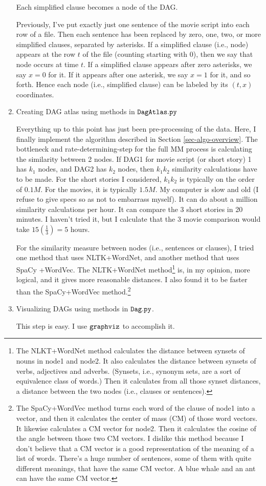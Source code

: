 \documentclass[12pt]{article}
\begin{document}
\begin{enumerate}
Each simplified clause becomes a node of the DAG.

Previously, I've put exactly just one sentence 
of the movie script into each row of a file.
Then each sentence has been 
replaced by zero, one, two, or more simplified clauses, separated by asterisks.
If  a simplified clause (i.e., node) appears at the
row $t$ of the file (counting starting with 0), then 
we say that node occurs at time $t$. If a simplified clause appears after zero asterisks, we say $x=0$ for it.
If it appears after one asterisk, we say $x=1$ for it, and so forth. Hence each node (i.e., simplified clause)
can be labeled by its $(t,x)$ coordinates.


\item Creating DAG atlas using methods in
$\tt DagAtlas.py$

Everything up to this point has just been
pre-processing of the data. 
Here, I finally implement the algorithm described
in Section \ref{sec-algo-overview}.
The bottleneck and rate-determining-step for
the full MM process is
calculating the similarity between 2 nodes.
If DAG1 for movie script (or short story) 1 has $k_1$ 
nodes, and DAG2 has $k_2$ nodes,
then $k_1 k_2$ similarity calculations have to be made.
For the short stories I considered, $k_1k_2$
is typically on the order of $0.1M$.
For the movies, it is typically $1.5M$.
My computer is slow and old (I refuse
to give specs so as not to embarrass myself).
It can do about a million similarity calculations per hour. It can compare the 3 short stories in 20 minutes. I haven't tried it, but I calculate that the
3 movie comparison would take $15(\frac{1}{3})=5$ hours.

For the similarity measure between nodes (i.e., sentences or clauses), I tried one method that uses NLTK+WordNet,
and another method that uses SpaCy  +WordVec.
The NLTK+WordNet method\footnote{The NLKT+WordNet method 
calculates the distance between synsets  of nouns
in node1 and node2.  It also calculates the distance between synsets of verbs, adjectives and adverbs. (Synsets, i.e., synonym sets,
are a sort of equivalence class of words.)
Then it calculates from all those synset distances,
a distance between the two nodes (i.e., clauses or sentences).} is, in my
opinion,  more logical, and it gives more reasonable distances. I also found it
to be faster than the SpaCy+WordVec method.\footnote{The
 SpaCy+WordVec method turns 
each word of the clause of node1 into a vector, and then it calculates the center of mass (CM) of those word vectors.
It likewise calculates a CM vector for node2. Then it calculates the cosine of the angle between those two CM vectors. I dislike this method because I don't believe that
a CM vector is a good representation of the
meaning of
a list of words. There's a huge number
of sentences, some
of them with quite different meanings, 
that have the same CM vector.
A blue whale and an ant can have the same CM vector.
}

\item Visualizing DAGs using methods in $\tt Dag.py$.

This step is easy. I use $\tt graphviz$ to 
accomplish it.

\end{enumerate}
\end{document}
